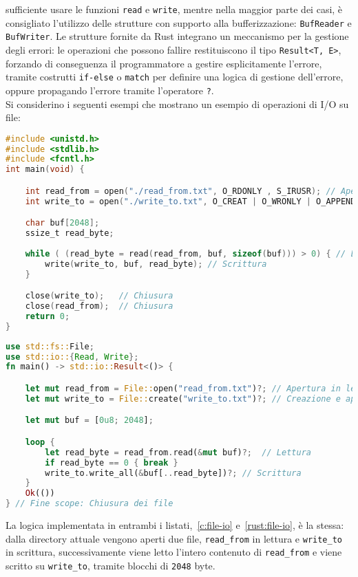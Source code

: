 sufficiente usare le funzioni \texttt{read} e \texttt{write}, mentre nella maggior parte dei casi, è consigliato l'utilizzo delle strutture con supporto alla bufferizzazione: \texttt{BufReader} e \texttt{BufWriter}.
Le strutture fornite da Rust integrano un meccanismo per la gestione degli errori: le operazioni che possono fallire restituiscono il tipo \texttt{Result<T, E>}, forzando di conseguenza il programmatore a gestire esplicitamente
l'errore, tramite costrutti \texttt{if-else} o \texttt{match} per definire una logica di gestione dell'errore, oppure propagando l'errore tramite l'operatore \texttt{?}. \hfill
\vspace{10pt}\\
\noindent Si considerino i seguenti esempi che mostrano un esempio di operazioni di I/O su file:
\begin{lstlisting}[language=C, caption={I/O su file in C}, label={c:file-io}]
#include <unistd.h>
#include <stdlib.h>
#include <fcntl.h>
int main(void) {

    int read_from = open("./read_from.txt", O_RDONLY , S_IRUSR); // Apertura file
    int write_to = open("./write_to.txt", O_CREAT | O_WRONLY | O_APPEND , S_IWUSR); // Apertura file

    char buf[2048];
    ssize_t read_byte;
    
    while ( (read_byte = read(read_from, buf, sizeof(buf))) > 0) { // Lettura
        write(write_to, buf, read_byte); // Scrittura
    }

    close(write_to);   // Chiusura
    close(read_from);  // Chiusura
    return 0;
}
\end{lstlisting}
\begin{lstlisting}[language=Rust, caption={I/O su file in Rust}, label={rust:file-io}]
use std::fs::File;
use std::io::{Read, Write};
fn main() -> std::io::Result<()> {

    let mut read_from = File::open("read_from.txt")?; // Apertura in lettura
    let mut write_to = File::create("write_to.txt")?; // Creazione e apertura in scrittura

    let mut buf = [0u8; 2048];

    loop {
        let read_byte = read_from.read(&mut buf)?;  // Lettura
        if read_byte == 0 { break }
        write_to.write_all(&buf[..read_byte])?; // Scrittura
    }
    Ok(())
} // Fine scope: Chiusura dei file
\end{lstlisting}
La logica implementata in entrambi i listati,~\ref{c:file-io} e~\ref{rust:file-io}, è la stessa: dalla directory attuale vengono aperti due file, \texttt{read\_from} in lettura e \texttt{write\_to} in scrittura, successivamente viene letto l'intero contenuto di \texttt{read\_from} e viene scritto su \texttt{write\_to}, tramite blocchi di \texttt{2048} byte.

